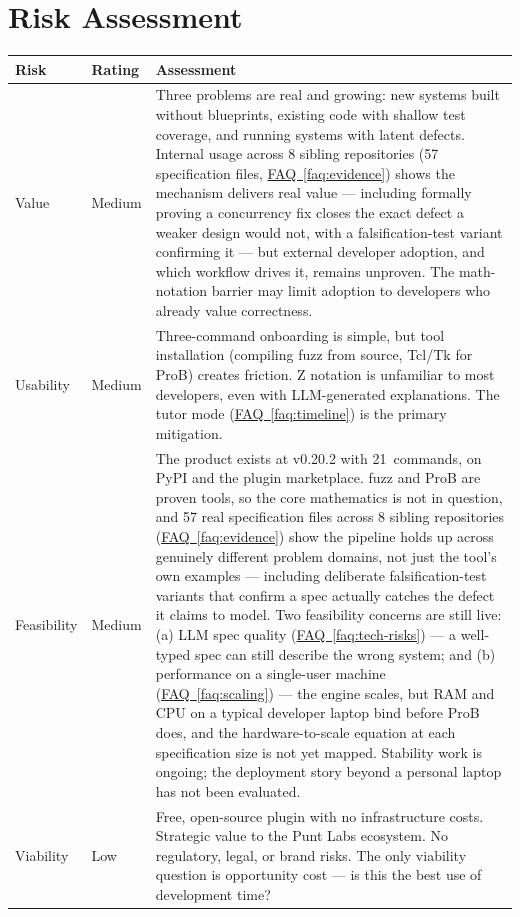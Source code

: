 \documentclass[11pt,letterpaper]{article}
\newcommand{\faqref}[1]{\hyperref[#1]{FAQ~\ref*{#1}}}
\begin{document}

\newpage
\section*{Risk Assessment}

\renewcommand{\arraystretch}{1.6}
\begin{tabularx}{\textwidth}{@{} l l X @{}}
\toprule
\textbf{\color{SectionBlue}Risk} & \textbf{\color{SectionBlue}Rating} & \textbf{\color{SectionBlue}Assessment} \\
\midrule
Value      & \textcolor{RiskAmber}{Medium} & Three problems are real and growing: new systems built without blueprints, existing code with shallow test coverage, and running systems with latent defects. Internal usage across 8 sibling repositories (57 specification files, \faqref{faq:evidence}) shows the mechanism delivers real value --- including formally proving a concurrency fix closes the exact defect a weaker design would not, with a falsification-test variant confirming it --- but external developer adoption, and which workflow drives it, remains unproven. The math-notation barrier may limit adoption to developers who already value correctness. \\
Usability  & \textcolor{RiskAmber}{Medium} & Three-command onboarding is simple, but tool installation (compiling fuzz from source, Tcl/Tk for ProB) creates friction. Z notation is unfamiliar to most developers, even with LLM-generated explanations. The tutor mode (\faqref{faq:timeline}) is the primary mitigation. \\
Feasibility & \textcolor{RiskAmber}{Medium} & The product exists at v0.20.2 with 21~commands, on PyPI and the plugin marketplace. fuzz and ProB are proven tools, so the core mathematics is not in question, and 57 real specification files across 8 sibling repositories (\faqref{faq:evidence}) show the pipeline holds up across genuinely different problem domains, not just the tool's own examples --- including deliberate falsification-test variants that confirm a spec actually catches the defect it claims to model. Two feasibility concerns are still live: (a) LLM spec quality (\faqref{faq:tech-risks}) --- a well-typed spec can still describe the wrong system; and (b) performance on a single-user machine (\faqref{faq:scaling}) --- the engine scales, but RAM and CPU on a typical developer laptop bind before ProB does, and the hardware-to-scale equation at each specification size is not yet mapped. Stability work is ongoing; the deployment story beyond a personal laptop has not been evaluated. \\
Viability  & \textcolor{RiskGreen}{Low}    & Free, open-source plugin with no infrastructure costs. Strategic value to the Punt Labs ecosystem. No regulatory, legal, or brand risks. The only viability question is opportunity cost --- is this the best use of development time? \\
\bottomrule
\end{tabularx}
\renewcommand{\arraystretch}{1.0}
\end{document}
